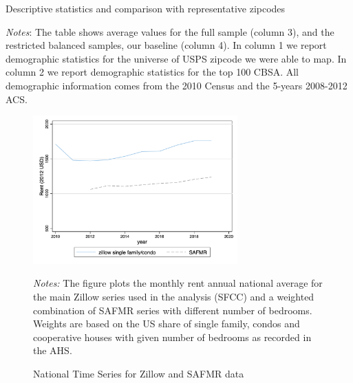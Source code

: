 \begin{table}[h!]
    \caption{Descriptive statistics and comparison with representative zipcodes}
    \centering
    \label{tab:desc_stats}    
    
   	\begin{minipage}{0.95\textwidth} \footnotesize
		\vspace{3mm} 
		\textit{Notes}: The table shows average values for the full sample (column 3), and the 
		restricted balanced samples, our baseline (column 4). In column 1 we report demographic 
		statistics for the universe of USPS zipcode we were able to map. In column 2 we report 
		demographic statistics for the top 100 CBSA. All demographic information comes from the 2010 
		Census and the 5-years 2008-2012 ACS.  
	\end{minipage}
\end{table}

\begin{figure}[!h]
    \centering
    \caption{National Time Series for Zillow and SAFMR data}
    \label{fig:trend_zillow_safmrwgt}
    \includegraphics[width = 0.7\textwidth]{../analysis/zillow_benchmark/output/trend_zillow_safmrwgt_zipcode_avg.png}
    \begin{minipage}{0.95\textwidth} \footnotesize
    	\vspace{3mm}
    	\textit{Notes:} The figure plots the monthly rent annual national average for the main Zillow 
    	series used in the analysis (SFCC) and a weighted combination of SAFMR series with different 
    	number of bedrooms. Weights are based on the US share of single family, condos and cooperative 
    	houses with given number of bedrooms as recorded in the AHS.    
    \end{minipage}
\end{figure}

